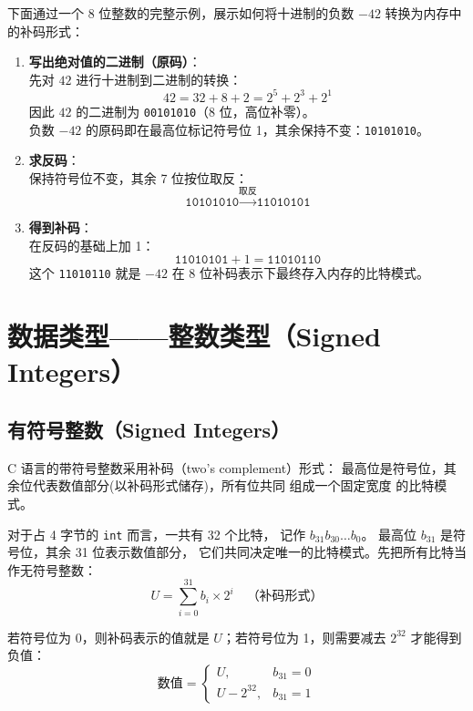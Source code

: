 下面通过一个 8 位整数的完整示例，展示如何将十进制的负数 $-42$ 转换为内存中的补码形式：

\begin{enumerate}[label=\ding{\numexpr171+\arabic*}]
    \item \textbf{写出绝对值的二进制（原码）}：\\
    先对 $42$ 进行十进制到二进制的转换：
    \[
    42 = 32 + 8 + 2 = 2^5 + 2^3 + 2^1
    \]
    因此 $42$ 的二进制为 \texttt{00101010}（8 位，高位补零）。\\
    负数 $-42$ 的原码即在最高位标记符号位 1，其余保持不变：\texttt{10101010}。
    
    \item \textbf{求反码}：\\
    保持符号位不变，其余 7 位按位取反：
    \[
    \texttt{10101010} \xrightarrow{\text{取反}} \texttt{11010101}
    \]
    
    \item \textbf{得到补码}：\\
    在反码的基础上加 1：
    \[
    \texttt{11010101} + 1 = \texttt{11010110}
    \]
    这个 \texttt{11010110} 就是 $-42$ 在 8 位补码表示下最终存入内存的比特模式。
\end{enumerate}
\newpage



\section{数据类型——整数类型（Signed Integers）}
\subsection{有符号整数（Signed Integers）}

C 语言的带符号整数采用补码（two's complement）形式：
最高位是符号位，其余位代表数值部分(以补码形式储存)，所有位共同
组成一个固定宽度
的比特模式。

对于占 4 字节的 \texttt{int} 而言，一共有 32 个比特，
记作 $b_{31} b_{30} \ldots b_0$。
最高位 $b_{31}$ 是符号位，其余 31 位表示数值部分，
它们共同决定唯一的比特模式。先把所有比特当作无符号整数：
\[
U = \sum_{i=0}^{31} b_i \times 2^i \quad \text{（补码形式）}
\]

若符号位为 0，则补码表示的值就是 $U$；若符号位为 1，则需要减去 $2^{32}$ 才能得到负值：
\[
\text{数值} =
\begin{cases}
U, & b_{31} = 0 \\
U - 2^{32}, & b_{31} = 1
\end{cases}
\]

